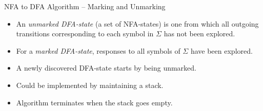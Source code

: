 \documentclass{beamer}
\begin{document}
\begin{frame}{NFA to DFA}
{Algorithm -- Marking and Unmarking}

\begin{itemize}
\item An \emph{unmarked DFA-state} (a set of NFA-states) is one from which all outgoing transitions corresponding to each symbol in $\Sigma$ has not been explored.
\item For a \emph{marked DFA-state}, responses to all symbols of $\Sigma$ have been explored. 
\item A newly discovered DFA-state starts by being unmarked.
\item Could be implemented by maintaining a stack.
\item Algorithm terminates when the stack goes empty.
\end{itemize}
\end{frame}
\end{document}

